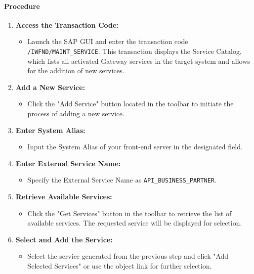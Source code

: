 \paragraph{Procedure}
\begin{enumerate}
    \item \textbf{Access the Transaction Code:}
    \begin{itemize}
        \item Launch the SAP GUI and enter the transaction code \texttt{/IWFND/MAINT\_SERVICE}. This transaction displays the Service Catalog, which lists all activated Gateway services in the target system and allows for the addition of new services.
    \end{itemize}

    \item \textbf{Add a New Service:}
    \begin{itemize}
        \item Click the "Add Service" button located in the toolbar to initiate the process of adding a new service.
    \end{itemize}

    \item \textbf{Enter System Alias:}
    \begin{itemize}
        \item Input the System Alias of your front-end server in the designated field.
    \end{itemize}

    \item \textbf{Enter External Service Name:}
    \begin{itemize}
        \item Specify the External Service Name as \texttt{API\_BUSINESS\_PARTNER}.
    \end{itemize}

    \item \textbf{Retrieve Available Services:}
    \begin{itemize}
        \item Click the "Get Services" button in the toolbar to retrieve the list of available services. The requested service will be displayed for selection.
    \end{itemize}

    \item \textbf{Select and Add the Service:}
    \begin{itemize}
        \item Select the service generated from the previous step and click "Add Selected Services" or use the object link for further selection.
    \end{itemize}


\end{enumerate}
